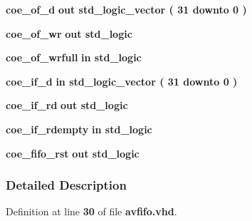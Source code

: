 \begin{DoxyCompactItemize}
\item 
{\bf coe\+\_\+of\+\_\+d}  {\bfseries {\bfseries \textcolor{keywordflow}{out}\textcolor{vhdlchar}{ }}} {\bfseries \textcolor{comment}{std\+\_\+logic\+\_\+vector}\textcolor{vhdlchar}{ }\textcolor{vhdlchar}{(}\textcolor{vhdlchar}{ }\textcolor{vhdlchar}{ } \textcolor{vhdldigit}{31} \textcolor{vhdlchar}{ }\textcolor{keywordflow}{downto}\textcolor{vhdlchar}{ }\textcolor{vhdlchar}{ } \textcolor{vhdldigit}{0} \textcolor{vhdlchar}{ }\textcolor{vhdlchar}{)}\textcolor{vhdlchar}{ }} 
\item 
{\bf coe\+\_\+of\+\_\+wr}  {\bfseries {\bfseries \textcolor{keywordflow}{out}\textcolor{vhdlchar}{ }}} {\bfseries \textcolor{comment}{std\+\_\+logic}\textcolor{vhdlchar}{ }} 
\item 
{\bf coe\+\_\+of\+\_\+wrfull}  {\bfseries {\bfseries \textcolor{keywordflow}{in}\textcolor{vhdlchar}{ }}} {\bfseries \textcolor{comment}{std\+\_\+logic}\textcolor{vhdlchar}{ }} 
\item 
{\bf coe\+\_\+if\+\_\+d}  {\bfseries {\bfseries \textcolor{keywordflow}{in}\textcolor{vhdlchar}{ }}} {\bfseries \textcolor{comment}{std\+\_\+logic\+\_\+vector}\textcolor{vhdlchar}{ }\textcolor{vhdlchar}{(}\textcolor{vhdlchar}{ }\textcolor{vhdlchar}{ } \textcolor{vhdldigit}{31} \textcolor{vhdlchar}{ }\textcolor{keywordflow}{downto}\textcolor{vhdlchar}{ }\textcolor{vhdlchar}{ } \textcolor{vhdldigit}{0} \textcolor{vhdlchar}{ }\textcolor{vhdlchar}{)}\textcolor{vhdlchar}{ }} 
\item 
{\bf coe\+\_\+if\+\_\+rd}  {\bfseries {\bfseries \textcolor{keywordflow}{out}\textcolor{vhdlchar}{ }}} {\bfseries \textcolor{comment}{std\+\_\+logic}\textcolor{vhdlchar}{ }} 
\item 
{\bf coe\+\_\+if\+\_\+rdempty}  {\bfseries {\bfseries \textcolor{keywordflow}{in}\textcolor{vhdlchar}{ }}} {\bfseries \textcolor{comment}{std\+\_\+logic}\textcolor{vhdlchar}{ }} 
\item 
{\bf coe\+\_\+fifo\+\_\+rst}  {\bfseries {\bfseries \textcolor{keywordflow}{out}\textcolor{vhdlchar}{ }}} {\bfseries \textcolor{comment}{std\+\_\+logic}\textcolor{vhdlchar}{ }} 
\end{DoxyCompactItemize}


\subsubsection{Detailed Description}


Definition at line {\bf 30} of file {\bf avfifo.\+vhd}.



